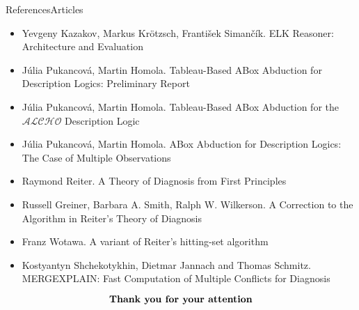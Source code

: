 \documentclass{beamer}
\begin{document}
\begin{frame}{References}{Articles}
	\begin{itemize}
	\item {
		Yevgeny Kazakov, Markus Krötzsch, František Simančík. ELK Reasoner: Architecture and Evaluation
	}
	\item {
		Júlia Pukancová, Martin Homola. Tableau-Based ABox Abduction for Description Logics: Preliminary Report
	}
	\item {
		Júlia Pukancová, Martin Homola. Tableau-Based ABox Abduction for the 		$\mathcal{ALCHO}$ Description Logic
	}
	\item {
		Júlia Pukancová, Martin Homola. ABox Abduction for Description Logics: The Case of Multiple Observations
	}
	\item {
		Raymond Reiter. A Theory of Diagnosis from First Principles
	}
	\item {
		Russell Greiner, Barbara A. Smith, Ralph W. Wilkerson. A Correction to the Algorithm in Reiter's Theory of Diagnosis
	}
	\item {
		Franz Wotawa. A variant of Reiter’s hitting-set algorithm
	}
	\item {
		Kostyantyn Shchekotykhin, Dietmar Jannach and Thomas Schmitz. MERGEXPLAIN: Fast Computation of Multiple Conflicts for Diagnosis
	}
	\end{itemize}
\end{frame}


\begin{frame}
	\[\text{\textbf{Thank you for your attention}}\]
\end{frame}



\end{document}
